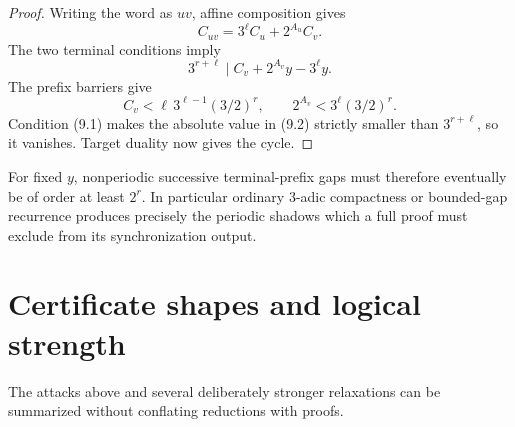 \documentclass[11pt,reqno]{amsart}
\theoremstyle{remark}
\begin{document}
\begin{proof}
Writing the word as $uv$, affine composition gives
\[
 C_{uv}=3^\ell C_u+2^{A_u}C_v.
\]
The two terminal conditions imply
\[
 3^{r+\ell}\mid C_v+2^{A_v}y-3^\ell y.               \tag{9.2}
\]
The prefix barriers give
\[
 C_v<\ell\,3^{\ell-1}(3/2)^r,\qquad
 2^{A_v}<3^\ell(3/2)^r.
\]
Condition (9.1) makes the absolute value in (9.2) strictly smaller than
$3^{r+\ell}$, so it vanishes.  Target duality now gives the cycle.
\end{proof}

For fixed $y$, nonperiodic successive terminal-prefix gaps must therefore
eventually be of order at least $2^r$.  In particular ordinary $3$-adic
compactness or bounded-gap recurrence produces precisely the periodic
shadows which a full proof must exclude from its synchronization output.

\section{Certificate shapes and logical strength}

The attacks above and several deliberately stronger relaxations can be
summarized without conflating reductions with proofs.
\end{document}

